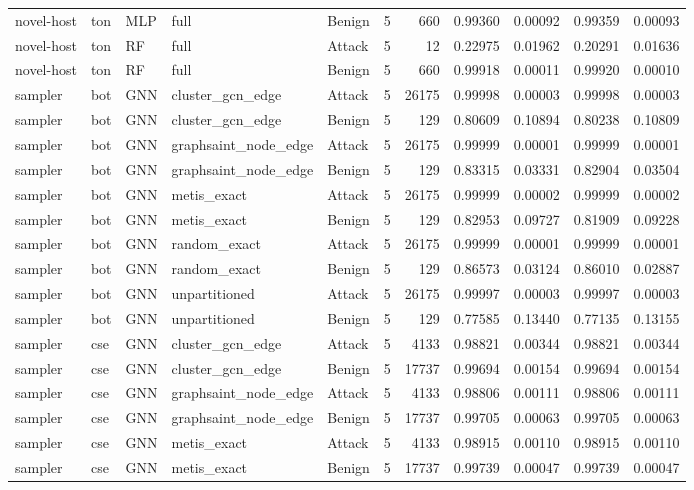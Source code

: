\begin{tabular}{lllllrrrrrr}
novel-host & ton & MLP & full & Benign & 5 & 660 & 0.99360 & 0.00092 & 0.99359 & 0.00093 \\
novel-host & ton & RF & full & Attack & 5 & 12 & 0.22975 & 0.01962 & 0.20291 & 0.01636 \\
novel-host & ton & RF & full & Benign & 5 & 660 & 0.99918 & 0.00011 & 0.99920 & 0.00010 \\
sampler & bot & GNN & cluster_gcn_edge & Attack & 5 & 26175 & 0.99998 & 0.00003 & 0.99998 & 0.00003 \\
sampler & bot & GNN & cluster_gcn_edge & Benign & 5 & 129 & 0.80609 & 0.10894 & 0.80238 & 0.10809 \\
sampler & bot & GNN & graphsaint_node_edge & Attack & 5 & 26175 & 0.99999 & 0.00001 & 0.99999 & 0.00001 \\
sampler & bot & GNN & graphsaint_node_edge & Benign & 5 & 129 & 0.83315 & 0.03331 & 0.82904 & 0.03504 \\
sampler & bot & GNN & metis_exact & Attack & 5 & 26175 & 0.99999 & 0.00002 & 0.99999 & 0.00002 \\
sampler & bot & GNN & metis_exact & Benign & 5 & 129 & 0.82953 & 0.09727 & 0.81909 & 0.09228 \\
sampler & bot & GNN & random_exact & Attack & 5 & 26175 & 0.99999 & 0.00001 & 0.99999 & 0.00001 \\
sampler & bot & GNN & random_exact & Benign & 5 & 129 & 0.86573 & 0.03124 & 0.86010 & 0.02887 \\
sampler & bot & GNN & unpartitioned & Attack & 5 & 26175 & 0.99997 & 0.00003 & 0.99997 & 0.00003 \\
sampler & bot & GNN & unpartitioned & Benign & 5 & 129 & 0.77585 & 0.13440 & 0.77135 & 0.13155 \\
sampler & cse & GNN & cluster_gcn_edge & Attack & 5 & 4133 & 0.98821 & 0.00344 & 0.98821 & 0.00344 \\
sampler & cse & GNN & cluster_gcn_edge & Benign & 5 & 17737 & 0.99694 & 0.00154 & 0.99694 & 0.00154 \\
sampler & cse & GNN & graphsaint_node_edge & Attack & 5 & 4133 & 0.98806 & 0.00111 & 0.98806 & 0.00111 \\
sampler & cse & GNN & graphsaint_node_edge & Benign & 5 & 17737 & 0.99705 & 0.00063 & 0.99705 & 0.00063 \\
sampler & cse & GNN & metis_exact & Attack & 5 & 4133 & 0.98915 & 0.00110 & 0.98915 & 0.00110 \\
sampler & cse & GNN & metis_exact & Benign & 5 & 17737 & 0.99739 & 0.00047 & 0.99739 & 0.00047 \\

\end{tabular}
